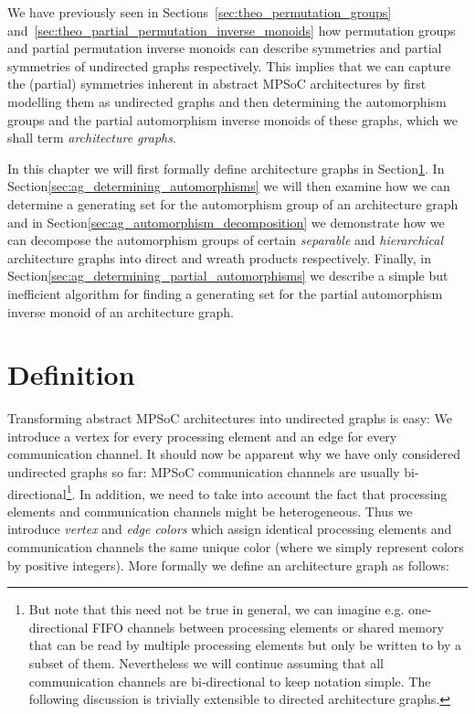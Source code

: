 We have previously seen in Sections~\ref{sec:theo_permutation_groups}
and~\ref{sec:theo_partial_permutation_inverse_monoids} how permutation groups
and partial permutation inverse monoids can describe symmetries and partial
symmetries of undirected graphs respectively. This implies that we can
capture the (partial) symmetries inherent in abstract MPSoC architectures by first
modelling them as undirected graphs and then determining the automorphism
groups and the partial automorphism inverse monoids of these graphs, which
we shall term \textit{architecture graphs}.

In this chapter we will first formally define architecture graphs in
Section\ref{sec:ag_definition}. In
Section\ref{sec:ag_determining_automorphisms} we will then examine how we can
determine a generating set for the automorphism group of an architecture
graph and in Section\ref{sec:ag_automorphism_decomposition} we demonstrate how
we can decompose the automorphism groups of certain \textit{separable} and
\textit{hierarchical} architecture graphs into direct and wreath products
respectively. Finally, in
Section\ref{sec:ag_determining_partial_automorphisms} we describe a simple but
inefficient algorithm for finding a generating set for the partial automorphism
inverse monoid of an architecture graph.

\section{Definition}
\label{sec:ag_definition}

Transforming abstract MPSoC architectures into undirected graphs is easy: We
introduce a vertex for every processing element and an edge for every
communication channel. It should now be apparent why we have only considered
undirected graphs so far: MPSoC communication channels are usually
bi-directional\footnote{But note that this need not be true in general, we can
imagine e.g. one-directional FIFO channels between processing elements or
shared memory that can be read by multiple processing elements but only be
written to by a subset of them.  Nevertheless we will continue assuming that
all communication channels are bi-directional to keep notation simple. The
following discussion is trivially extensible to directed architecture graphs.}.
In addition, we need to take into account the fact that processing elements and
communication channels might be heterogeneous. Thus we introduce
\textit{vertex} and \textit{edge colors} which assign identical processing
elements and communication channels the same unique color (where we simply
represent colors by positive integers). More formally we define an
architecture graph as follows:

